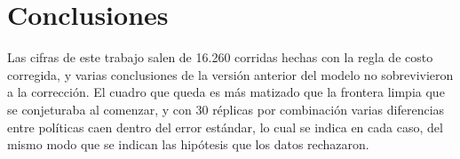 \section{Conclusiones}\label{sec:conclusiones}

Las cifras de este trabajo salen de 16.260 corridas hechas con la regla de costo corregida, y varias conclusiones de la versión anterior del modelo no sobrevivieron a la corrección. El cuadro que queda es más matizado que la frontera limpia que se conjeturaba al comenzar, y con 30 réplicas por combinación varias diferencias entre políticas caen dentro del error estándar, lo cual se indica en cada caso, del mismo modo que se indican las hipótesis que los datos rechazaron.

